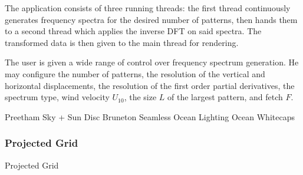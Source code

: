 The application consists of three running threads: the first thread continuously
generates frequency spectra for the desired number of patterns, then hands them
to a second thread which applies the inverse DFT on said spectra. The transformed
data is then given to the main thread for rendering.

The user is given a wide range of control over frequency spectrum generation.
He may configure the number of patterns, the resolution of the vertical and horizontal
displacements, the resolution of the first order partial derivatives,
the spectrum type, wind velocity $U_{10}$, the size $L$ of the largest pattern,
and fetch $F$.


Preetham Sky + Sun Disc\cite{Preetham:1999}
Bruneton Seamless Ocean Lighting \cite{article:oceanlighting}\cite{misc:oceanlightingfft}
Ocean Whitecaps\cite{article:whitecaps}

\subsubsection{Projected Grid}
Projected Grid\cite{thesis:johanson}
